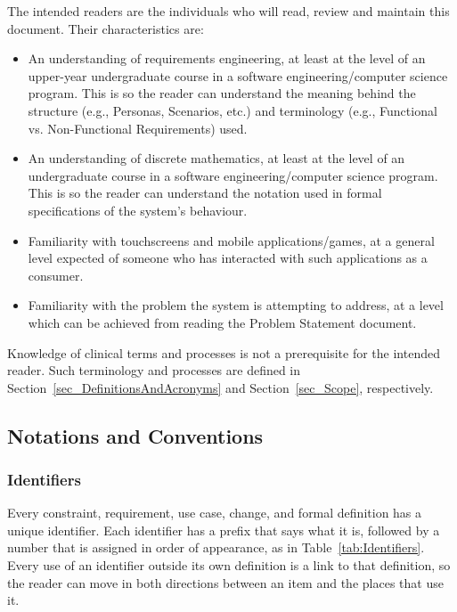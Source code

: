 \documentclass[10pt]{article}
\begin{document}
The intended readers are the individuals who will read, review and maintain this document. Their characteristics are:
\begin{itemize}
\item An understanding of requirements engineering, at least at the level of an upper-year undergraduate course in a software
engineering/computer science program. This is so the reader can understand the meaning behind the structure (e.g., Personas, Scenarios, etc.)
and terminology (e.g., Functional vs. Non-Functional Requirements) used.
\item An understanding of discrete mathematics, at least at the level of an undergraduate course in a software engineering/computer science program.
This is so the reader can understand the notation used in formal specifications of the system's behaviour.
\item Familiarity with touchscreens and mobile applications/games, at a general level expected of someone who has interacted
with such applications as a consumer.
\item Familiarity with the problem the system is attempting to address, at a level which can be achieved from reading
the Problem Statement document.
\end{itemize}

Knowledge of clinical terms and processes is not a prerequisite for the intended reader. Such terminology and processes are defined in
Section~\ref{sec_DefinitionsAndAcronyms} and Section~\ref{sec_Scope}, respectively.

\subsection{Notations and Conventions} \label{sec_NotationsConventions}

\subsubsection*{Identifiers}

Every constraint, requirement, use case, change, and formal definition has a
unique identifier. Each identifier has a prefix that says what it is, followed
by a number that is assigned in order of appearance, as in
Table~\ref{tab:Identifiers}. Every use of an identifier outside its own
definition is a link to that definition, so the reader can move in both
directions between an item and the places that use it.
\end{document}
